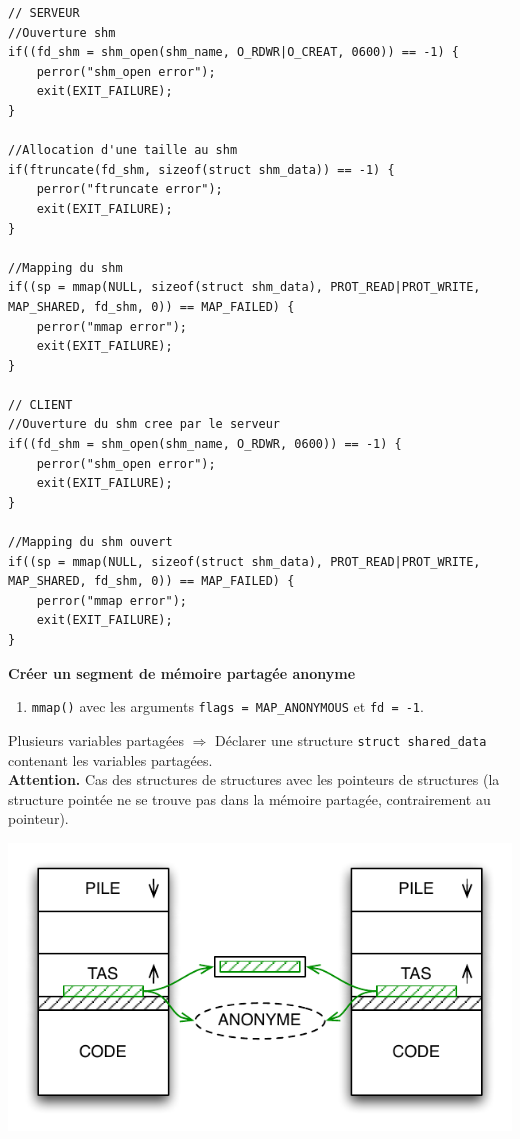 \documentclass[french]{scrartcl}
\makeatletter
\newenvironment{BlockIndent}{\list{}%
    {\setlength{\leftmargin}{4mm}%
	 \setlength{\listparindent}{\parindent}%
     \setlength{\itemindent}{\listparindent}%
     \setlength{\topsep}{0pt}}%
     \item[]\relax}
{\endlist}
\newenvironment{figurehere}
  {\def\@captype{figure}}
  {}
\makeatother
\begin{document}
\begin{multicols}{3}
\begin{BlockIndent}
\begin{lstlisting}
// SERVEUR
//Ouverture shm
if((fd_shm = shm_open(shm_name, O_RDWR|O_CREAT, 0600)) == -1) {
	perror("shm_open error");
	exit(EXIT_FAILURE);
}

//Allocation d'une taille au shm
if(ftruncate(fd_shm, sizeof(struct shm_data)) == -1) {
	perror("ftruncate error");
	exit(EXIT_FAILURE);
}

//Mapping du shm
if((sp = mmap(NULL, sizeof(struct shm_data), PROT_READ|PROT_WRITE, MAP_SHARED, fd_shm, 0)) == MAP_FAILED) {
	perror("mmap error");
	exit(EXIT_FAILURE);
}

// CLIENT
//Ouverture du shm cree par le serveur
if((fd_shm = shm_open(shm_name, O_RDWR, 0600)) == -1) {
	perror("shm_open error");
	exit(EXIT_FAILURE);
}

//Mapping du shm ouvert
if((sp = mmap(NULL, sizeof(struct shm_data), PROT_READ|PROT_WRITE, MAP_SHARED, fd_shm, 0)) == MAP_FAILED) {
	perror("mmap error");
	exit(EXIT_FAILURE);
}
\end{lstlisting}\vspace{-5pt}
\end{BlockIndent}

\columnbreak
\vskip 5pt
\textbf{Créer un segment de mémoire partagée anonyme}
\begin{enumerate}
	\item \lstinline!mmap()! avec les arguments \lstinline!flags = MAP_ANONYMOUS! et \lstinline!fd = -1!.
\end{enumerate}

Plusieurs variables partagées $\Rightarrow$ Déclarer une structure \lstinline!struct shared_data! contenant les variables partagées.\\
\textbf{Attention.} Cas des structures de structures avec les pointeurs de structures (la structure pointée ne se trouve pas dans la mémoire partagée, contrairement au pointeur).

\begin{figurehere}
    \includegraphics[scale=.6]{images/mmap}
\end{figurehere}


\end{multicols}
\end{document}
